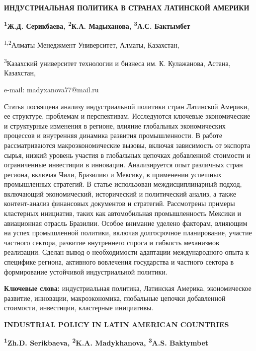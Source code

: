 \begin{articleheader}
{\bfseries ИНДУСТРИАЛЬНАЯ ПОЛИТИКА В СТРАНАХ ЛАТИНСКОЙ АМЕРИКИ}

{\bfseries
\textsuperscript{1}Ж.Д. Серикбаева,
\textsuperscript{2}К.А. Мадыханова\textsuperscript{\envelope },
\textsuperscript{3}А.С. Бактымбет
}
\end{articleheader}

\begin{affiliation}
\textsuperscript{1,2}Алматы Менеджмент Университет, Алматы, Казахстан,

\textsuperscript{3}Казахский университет технологии и бизнеса им. К. Кулажанова, Астана, Казахстан,

e-mail: madyxanova77@mail.ru
\end{affiliation}

Статья посвящена анализу индустриальной политики стран Латинской
Америки, ее структуре, проблемам и перспективам. Исследуются ключевые
экономические и структурные изменения в регионе, влияние глобальных
экономических процессов и внутренняя динамика развития промышленности. В
работе рассматриваются макроэкономические вызовы, включая зависимость от
экспорта сырья, низкий уровень участия в глобальных цепочках добавленной
стоимости и ограниченные инвестиции в инновации. Анализируется опыт
различных стран региона, включая Чили, Бразилию и Мексику, в применении
успешных промышленных стратегий. В статье использован междисциплинарный
подход, включающий экономический, исторический и политический анализ, а
также контент-анализ финансовых документов и стратегий. Рассмотрены
примеры кластерных инициатив, таких как автомобильная промышленность
Мексики и авиационная отрасль Бразилии. Особое внимание уделено
факторам, влияющим на успех промышленной политики, включая долгосрочное
планирование, участие частного сектора, развитие внутреннего спроса и
гибкость механизмов реализации. Сделан вывод о необходимости адаптации
международного опыта к специфике региона, активного вовлечения
государства и частного сектора в формирование устойчивой индустриальной
политики.

{\bfseries Ключевые слова:} индустриальная политика, Латинская Америка,
экономическое развитие, инновации, макроэкономика, глобальные цепочки
добавленной стоимости, инвестиции, кластерные инициативы.

\begin{articleheader}
{\bfseries INDUSTRIAL POLICY IN LATIN AMERICAN COUNTRIES}

{\bfseries
\textsuperscript{1}Zh.D. Serikbaeva,
\textsuperscript{2}K.A. Madykhanova\textsuperscript{\envelope },
\textsuperscript{3}A.S. Baktymbet
}
\end{articleheader}

